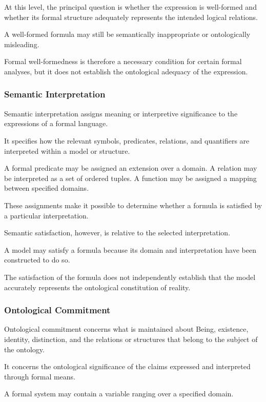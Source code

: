 At this level, the principal question
is whether the expression is well-formed
and whether its formal structure
adequately represents the intended
logical relations.

A well-formed formula may still
be semantically inappropriate
or ontologically misleading.

Formal well-formedness is therefore
a necessary condition for certain
formal analyses, but it does not
establish the ontological adequacy
of the expression.

\subsubsection{Semantic Interpretation}

Semantic interpretation assigns
meaning or interpretive significance
to the expressions of a formal language.

It specifies how the relevant
symbols, predicates, relations,
and quantifiers are interpreted
within a model or structure.

A formal predicate may be assigned
an extension over a domain.
A relation may be interpreted
as a set of ordered tuples.
A function may be assigned
a mapping between specified
domains.

These assignments make it possible
to determine whether a formula
is satisfied by a particular
interpretation.

Semantic satisfaction, however,
is relative to the selected
interpretation.

A model may satisfy a formula
because its domain and
interpretation have been
constructed to do so.

The satisfaction of the formula
does not independently establish
that the model accurately
represents the ontological
constitution of reality.

\subsubsection{Ontological Commitment}

Ontological commitment concerns
what is maintained about Being,
existence, identity, distinction,
and the relations or structures
that belong to the subject
of the ontology.

It concerns the ontological
significance of the claims
expressed and interpreted
through formal means.

A formal system may contain
a variable ranging over
a specified domain.

